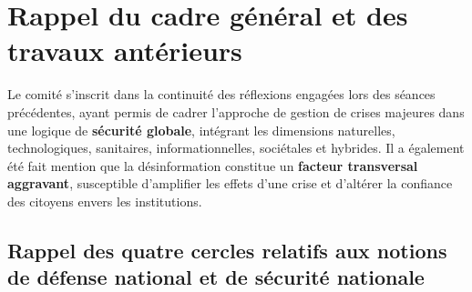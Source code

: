 \documentclass[12pt,a4paper]{article}
\begin{document}

\section{Rappel du cadre général et des travaux antérieurs}

Le comité s'inscrit dans la continuité des réflexions engagées lors des séances précédentes, ayant permis de cadrer l'approche de gestion de crises majeures dans une logique de \textbf{sécurité globale}, intégrant les dimensions naturelles, technologiques, sanitaires, informationnelles, sociétales et hybrides.
Il a également été fait mention que la désinformation constitue un \textbf{facteur transversal aggravant}, susceptible d'amplifier les effets d'une crise et d'altérer la confiance des citoyens envers les institutions.

\subsection{Rappel des quatre cercles relatifs aux notions de défense national et de sécurité nationale}
\end{document}
